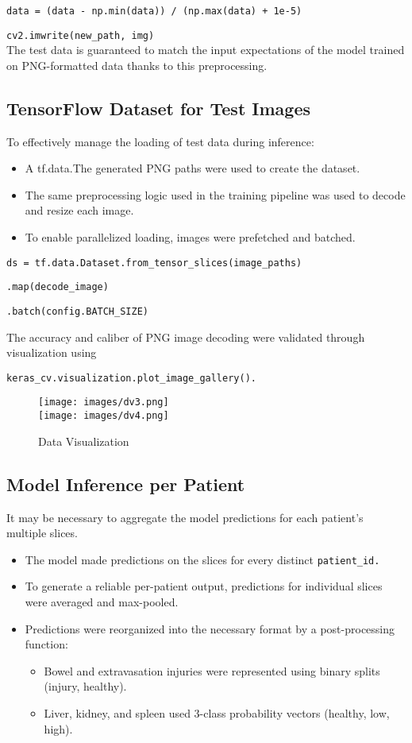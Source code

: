 \documentclass[a4paper,12pt]{article}
\begin{document}
\verb|data = (data - np.min(data)) / (np.max(data) + 1e-5)|

\verb|cv2.imwrite(new_path, img)|
\\
The test data is guaranteed to match the input expectations of the model trained on PNG-formatted data thanks to this preprocessing.

\subsection{TensorFlow Dataset for Test Images}
To effectively manage the loading of test data during inference:
\begin{itemize}
    \item A tf.data.The generated PNG paths were used to create the dataset.
    \item The same preprocessing logic used in the training pipeline was used to decode and resize each image.
    \item To enable parallelized loading, images were prefetched and batched.
\end{itemize}

\verb|ds = tf.data.Dataset.from_tensor_slices(image_paths)|

\verb|.map(decode_image)|

\verb|.batch(config.BATCH_SIZE)|


The accuracy and caliber of PNG image decoding were validated through visualization using 

\verb|keras_cv.visualization.plot_image_gallery().|

\begin{figure}[!htbp]
    \centering
    \texttt{[image: images/dv3.png]}\\[1ex]
    \texttt{[image: images/dv4.png]}
    \caption{Data Visualization}
    \label{fig:dv_meth}
\end{figure}


\subsection{Model Inference per Patient}
It may be necessary to aggregate the model predictions for each patient's multiple slices.

\begin{itemize}
    \item The model made predictions on the slices for every distinct \verb|patient_id.|
    \item To generate a reliable per-patient output, predictions for individual slices were averaged and max-pooled.
    \item Predictions were reorganized into the necessary format by a post-processing function:
    \begin{itemize}
        \item Bowel and extravasation injuries were represented using binary splits (injury, healthy).
        \item Liver, kidney, and spleen used 3-class probability vectors (healthy, low, high).
    \end{itemize}
  
\end{itemize}
\end{document}
